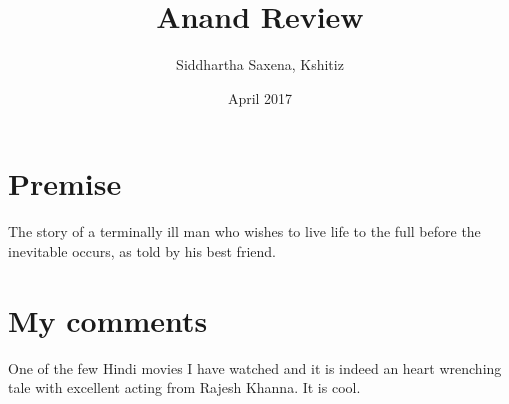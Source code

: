 \documentclass{article}
\title{Anand Review}
\author{Siddhartha Saxena, Kshitiz}
\date{April 2017}
\begin{document}
\maketitle

\section{Premise}
The story of a terminally ill man who wishes to live life to the full before the inevitable occurs, as told by his best friend.
\section{My comments}
One of the few Hindi movies I have watched and it is indeed an heart wrenching tale with excellent acting from Rajesh Khanna.
It is cool.
\end{document}
